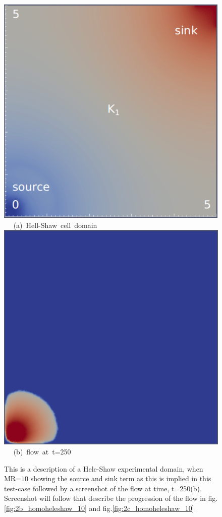\documentclass[preprint,authoryear,12pt]{elsarticle}
\begin{document}
\begin{figure}[h]
\vbox{
\hbox{\hspace{3.5cm}
\includegraphics[width=.5\textwidth]{./Pics1/Saffman_homogeneous/saffman_homo_fixed_1.pdf} 
}
\vspace{0.0cm}
\hbox{\hspace{5.0cm} (a) Hell-Shaw cell domain   
}
\vspace{0.25cm}
\hbox{\hspace{3.5cm}
\includegraphics[width=.5\textwidth]{./Pics1/Saffman_homogeneous/saffman_homo_fixed_250_1.pdf}
}
\vspace{0.0cm}
\hbox{\hspace{5.0cm} (b) flow at t=250  
}
}     
\caption{This is a description of a Hele-Shaw experimental domain, when MR=$10$ showing the source and sink term as this is implied in this test-case followed by a screenshot of the flow at time, t=250(b). Screenshot will follow that describe the progression of the flow in fig.\ref{fig:2b_homoheleshaw_10} and fig.\ref{fig:2c_homoheleshaw_10}}
\label{fig:2a_homoheleshaw_10}
\end{figure}
\end{document}

